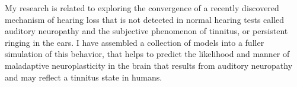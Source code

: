 My research is related to exploring the convergence of a recently discovered mechanism of hearing loss that is not detected in normal hearing tests called auditory neuropathy and the subjective phenomenon of tinnitus, or persistent ringing in the ears.   I have assembled a collection of models into a fuller simulation of this behavior, that helps to predict the likelihood and manner of maladaptive neuroplasticity in the brain that results from auditory neuropathy and may reflect a tinnitus state in humans. 